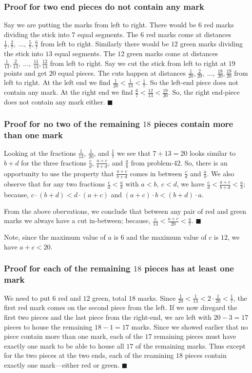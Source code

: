 \documentclass{article}
\begin{document}
\subsubsection{Proof for two end pieces do not contain any mark}
Say we are putting the marks from left to right. There would be $6$ red marks dividing the stick into $7$ equal segments. The $6$ red marks come at distances $\frac{1}{7}, \frac{2}{7},\ \ldots,\ \frac{5}{7}, \frac{6}{7}$ from left to right. Similarly there would be $12$ green marks dividing the stick into $13$ equal segments. The $12$ green marks come at distances $\frac{1}{13}, \frac{2}{13},\ \ldots,\ \frac{11}{13},\frac{12}{13}$ from left to right. Say we cut the stick from left to right at $19$ points and get $20$ equal pieces. The cuts happen at distances $\frac{1}{20}, \frac{2}{20},\ \ldots,\ \frac{18}{20}, \frac{19}{20}$ from left to right. At the left end we find $\frac{1}{20} < \frac{1}{13} < \frac{1}{7}$. So the left-end piece does not contain any mark. At the right end we find $\frac{6}{7} < \frac{12}{13} < \frac{19}{20}$. So, the right end-piece does not contain any mark either.  $\blacksquare$

\subsubsection{Proof for no two of the remaining $18$ pieces contain more than one mark}
Looking at the fractions $\frac{1}{13}$, $\frac{1}{20}$, and $\frac{1}{7}$ we see that $7+13=20$ looks similar to $b+d$ for the three fractions $\frac{c}{d}$, $\frac{a+c}{b+d}$, and $\frac{a}{b}$ from problem-42. So, there is an opportunity to use the property that $\frac{a+c}{b+d}$ comes in between $\frac{c}{d}$ and $\frac{a}{b}$. We also observe that for any two fractions $\frac{c}{d} < \frac{a}{b}$ with $a < b,\ c < d$, we have $\frac{c}{d} < \frac{a+c}{b+d} < \frac{a}{b}$; because, $c \cdot (b+d) < d \cdot (a+c)$ and $(a+c) \cdot b < (b+d) \cdot a$.

From the above obervations, we conclude that between any pair of red and green marks we always have a cut in-between; because, $\frac{c}{13} < \frac{a+c}{20} < \frac{a}{7}$.  $\blacksquare$

Note, since the maximum value of $a$ is $6$ and the maximum value of $c$ is $12$, we have $a+c < 20$.

\subsubsection{Proof for each of the remaining $18$ pieces has at least one mark}
We need to put $6$ red and $12$ green, total $18$ marks. Since $\frac{1}{20} < \frac{1}{13} < 2 \cdot \frac{1}{20} < \frac{1}{7}$, the first red mark comes on the second piece from the left. If we now diregard the first two pieces and the last piece from the right-end, we are left with $20-3 = 17$ pieces to house the remaining $18-1=17$ marks. Since we showed earlier that no piece contain more than one mark, each of the $17$ remaining pieces must have exactly one mark to be able to house all $17$ of the remaining marks. Thus except for the two pieces at the two ends, each of the reamining $18$ pieces contain exactly one mark---either red or green.  $\blacksquare$
\end{document}
